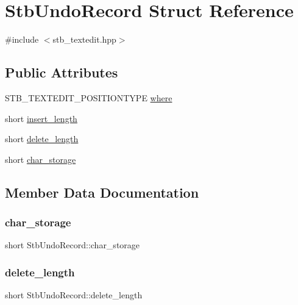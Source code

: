 \hypertarget{struct_stb_undo_record}{}\section{Stb\+Undo\+Record Struct Reference}
\label{struct_stb_undo_record}


{\ttfamily \#include $<$stb\+\_\+textedit.\+hpp$>$}

\subsection*{Public Attributes}
\begin{DoxyCompactItemize}
\item 
S\+T\+B\+\_\+\+T\+E\+X\+T\+E\+D\+I\+T\+\_\+\+P\+O\+S\+I\+T\+I\+O\+N\+T\+Y\+PE \hyperlink{struct_stb_undo_record_a49e87adbb75a18ffba1f853ac974b31d}{where}
\item 
short \hyperlink{struct_stb_undo_record_ae2a3af79db791549db0c42263407cab5}{insert\+\_\+length}
\item 
short \hyperlink{struct_stb_undo_record_ad81789175cef417a0fe58204277fd735}{delete\+\_\+length}
\item 
short \hyperlink{struct_stb_undo_record_a654ca22cb5021a8ee18ad5f500eb406d}{char\+\_\+storage}
\end{DoxyCompactItemize}


\subsection{Member Data Documentation}
\hypertarget{struct_stb_undo_record_a654ca22cb5021a8ee18ad5f500eb406d}{}\label{struct_stb_undo_record_a654ca22cb5021a8ee18ad5f500eb406d} 
\subsubsection{\texorpdfstring{char\+\_\+storage}{char\_storage}}
{\footnotesize\ttfamily short Stb\+Undo\+Record\+::char\+\_\+storage}

\hypertarget{struct_stb_undo_record_ad81789175cef417a0fe58204277fd735}{}\label{struct_stb_undo_record_ad81789175cef417a0fe58204277fd735} 
\subsubsection{\texorpdfstring{delete\+\_\+length}{delete\_length}}
{\footnotesize\ttfamily short Stb\+Undo\+Record\+::delete\+\_\+length}

